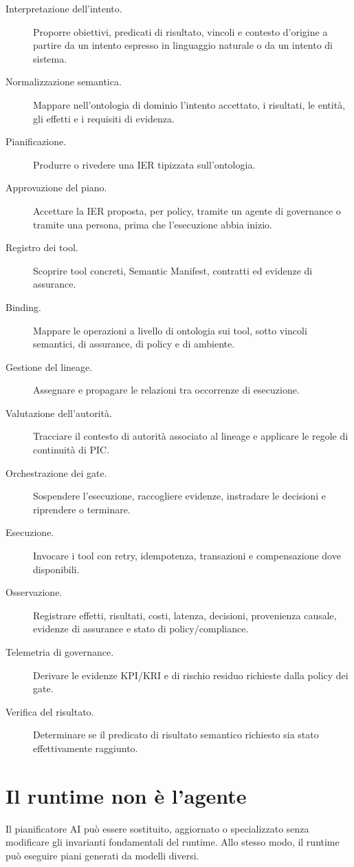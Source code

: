 \documentclass[10pt,oneside,openany]{book}
\begin{document}
\begin{description}
\item[Interpretazione dell'intento.] Proporre obiettivi, predicati di risultato, vincoli e contesto d'origine a partire da un intento espresso in linguaggio naturale o da un intento di sistema.
\item[Normalizzazione semantica.] Mappare nell'ontologia di dominio l'intento accettato, i risultati, le entità, gli effetti e i requisiti di evidenza.
\item[Pianificazione.] Produrre o rivedere una IER tipizzata sull'ontologia.
\item[Approvazione del piano.] Accettare la IER proposta, per policy, tramite un agente di governance o tramite una persona, prima che l'esecuzione abbia inizio.
\item[Registro dei tool.] Scoprire tool concreti, Semantic Manifest, contratti ed evidenze di assurance.
\item[Binding.] Mappare le operazioni a livello di ontologia sui tool, sotto vincoli semantici, di assurance, di policy e di ambiente.
\item[Gestione del lineage.] Assegnare e propagare le relazioni tra occorrenze di esecuzione.
\item[Valutazione dell'autorità.] Tracciare il contesto di autorità associato al lineage e applicare le regole di continuità di PIC.
\item[Orchestrazione dei gate.] Sospendere l'esecuzione, raccogliere evidenze, instradare le decisioni e riprendere o terminare.
\item[Esecuzione.] Invocare i tool con retry, idempotenza, transazioni e compensazione dove disponibili.
\item[Osservazione.] Registrare effetti, risultati, costi, latenza, decisioni, provenienza causale, evidenze di assurance e stato di policy/compliance.
\item[Telemetria di governance.] Derivare le evidenze KPI/KRI e di rischio residuo richieste dalla policy dei gate.
\item[Verifica del risultato.] Determinare se il predicato di risultato semantico richiesto sia stato effettivamente raggiunto.
\end{description}

\section{Il runtime non è l'agente}
Il pianificatore AI può essere sostituito, aggiornato o specializzato senza modificare gli invarianti fondamentali del runtime. Allo stesso modo, il runtime può eseguire piani generati da modelli diversi.
\end{document}
